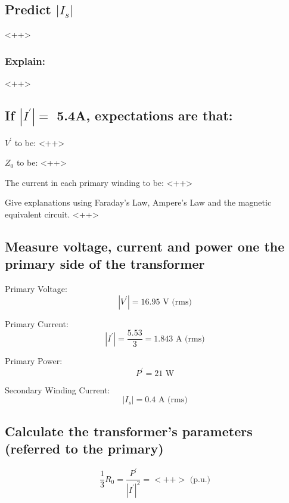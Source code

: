 \documentclass{article}
\begin{document}
\subsection{Predict $|I_s|$}
<++>
\subsubsection{Explain:} 
<++>

\subsection{If $|I^{'} | = $ 5.4A, expectations are that:}

$V^{'}$ to be: <++>

$Z_0$ to be: <++>

The current in each primary winding to be: <++>

Give explanations using Faraday's Law, Ampere's Law and the magnetic equivalent circuit.
<++>

\subsection{Measure voltage, current and power one the primary side of the transformer} 

Primary Voltage:
\begin{equation}
  | V^{'} | = 16.95 \text{ V (rms)}
\end{equation}

Primary Current:
\begin{equation}
  | I^{'} | = \frac{5.53}{3} = 1.843 \text{ A (rms)}
\end{equation}

Primary Power:
\begin{equation}
  P^{'} = 21 \text{ W}
\end{equation}

Secondary Winding Current:
\begin{equation}
  | I_{s} | = 0.4 \text{ A (rms)}
\end{equation}

\subsection{Calculate the transformer's parameters (referred to the primary)} 

\begin{equation}
  \frac{1}{3} R_0 = \frac{P^{'}}{|I^{'} |^{2}} = <++> \text{ (p.u.)}
\end{equation}
\end{document}
